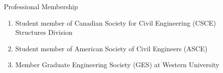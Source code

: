 \documentclass{resume} %
\begin{document}
\begin{rSection}{Professional Membership}

\begin{rSubsection}{ }{}{}{}
\begin{enumerate}

\item Student member of Canadian Society for Civil Engineering (CSCE) Structures Division
\item Student member of American Society of Civil Engineers (ASCE) 
\item Member Graduate Engineering Society (GES) at Western University

\end{enumerate}
\end{rSubsection}
\end{rSection}

\pagebreak
\end{document}
